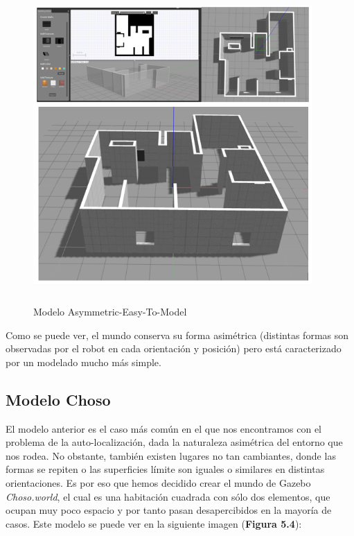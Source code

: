 \begin{figure}[H]
  \begin{center}
    \includegraphics[width=0.95\textwidth, height=12cm]{figures/modeloasymmetric.png}
		\caption{Modelo Asymmetric-Easy-To-Model}
		\label{fig.modeloasymmetric}
		\end{center}
\end{figure}

Como se puede ver, el mundo conserva su forma asimétrica (distintas formas son observadas por el robot en cada orientación y posición) pero está caracterizado por un modelado mucho más simple. 

\subsection{Modelo Choso}
El modelo anterior es el caso más común en el que nos encontramos con el problema de la auto-localización, dada la naturaleza asimétrica del entorno que nos rodea. No obstante, también existen lugares no tan cambiantes, donde las formas se repiten o las superficies límite son iguales o similares en distintas orientaciones. Es por eso que hemos decidido crear el mundo de Gazebo \textit{Choso.world}, el cual es una habitación cuadrada con sólo dos elementos, que ocupan muy poco espacio y por tanto pasan desapercibidos en la mayoría de casos. Este modelo se puede ver en la siguiente imagen (\textbf{Figura 5.4}):

